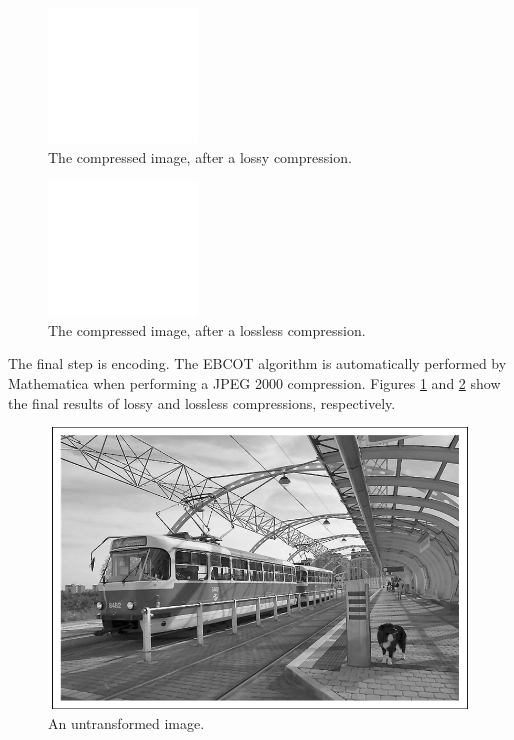 \documentclass[titlepage,12pt]{article}
\begin{document}
\begin{figure}
	\centering
	\includegraphics{resources/finalLossyBaby.png}
	\caption{The compressed image, after a lossy compression.}
	\label{fig:finalLossyBaby}
\end{figure}
\begin{figure}
	\centering
	\includegraphics{resources/finalLosslessBaby.png}
	\caption{The compressed image, after a lossless compression.}
	\label{fig:finalLosslessBaby}
\end{figure}

The final step is encoding.
The EBCOT algorithm is automatically performed by Mathematica 
when performing a JPEG 2000 compression.
Figures \ref{fig:finalLossyBaby} and \ref{fig:finalLosslessBaby} 
show the final results of lossy and lossless compressions, respectively.

\begin{figure}
	\centering
	\includegraphics[scale=0.25]{resources/example/originalExample.png}
	\caption{An untransformed image.}
	\label{fig:originalExample}
\end{figure}
\end{document}
